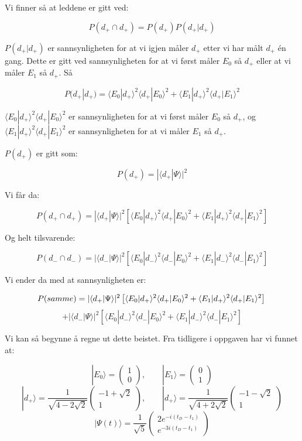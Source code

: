 \documentclass[a4paper,norsk, 10pt]{article}
\numberwithin{equation}{section}
\begin{document}
Vi finner så at leddene er gitt ved:

$$
P(d_+ \cap d_+) = P(d_+)P(d_+|d_+)
$$

$P(d_+|d_+)$ er sannsynligheten for at vi igjen måler $d_+$ etter vi har målt $d_+$ én gang. Dette er gitt ved sannsynligheten for at vi først måler $E_0$ så $d_+$ eller at vi måler $E_1$ så $d_+$. Så

$$
P(d_+|d_+) = \langle E_0|d_+\rangle^2\langle d_+|E_0\rangle^2 + \langle E_1|d_+\rangle^2\langle d_+|E_1\rangle^2
$$

$\langle E_0|d_+\rangle^2\langle d_+|E_0\rangle^2$ er sannsynligheten for at vi først måler $E_0$ så $d_+$, og $\langle E_1|d_+\rangle^2\langle d_+|E_1\rangle^2$ er sannsynligheten for at vi måler $E_1$ så $d_+$. 

$P(d_+)$ er gitt som:

$$
P(d_+) = |\langle d_+|\Psi\rangle|^2
$$

Vi får da:

$$
P(d_+ \cap d_+) = |\langle d_+|\Psi\rangle|^2\left[\langle E_0|d_+\rangle^2\langle d_+|E_0\rangle^2 + \langle E_1|d_+\rangle^2\langle d_+|E_1\rangle^2\right]
$$


Og helt tilsvarende:

$$
P(d_- \cap d_-) = |\langle d_-|\Psi\rangle|^2\left[\langle E_0|d_-\rangle^2\langle d_-|E_0\rangle^2 + \langle E_1|d_-\rangle^2\langle d_-|E_1\rangle^2\right]
$$

Vi ender da med at sannsynligheten er:

$$
P(samme) = |\langle d_+|\Psi\rangle|^2\left[\langle E_0|d_+\rangle^2\langle d_+|E_0\rangle^2 + \langle E_1|d_+\rangle^2\langle d_+|E_1\rangle^2\right] \\
$$
$$
+
 |\langle d_-|\Psi\rangle|^2\left[\langle E_0|d_-\rangle^2\langle d_-|E_0\rangle^2 + \langle E_1|d_-\rangle^2\langle d_-|E_1\rangle^2\right]
$$

Vi kan så begynne å regne ut dette beistet. Fra tidligere i oppgaven har vi funnet at:

$$
|E_0\rangle = 
\begin{pmatrix}
1\\0
\end{pmatrix}
, \qquad
|E_1\rangle = 
\begin{pmatrix}
0\\1
\end{pmatrix}
$$
$$
|d_+\rangle = 
\frac{1}{\sqrt{4-2\sqrt{2}}}
\begin{pmatrix}
-1+\sqrt{2}\\1
\end{pmatrix}
,\qquad
|d_+\rangle = 
\frac{1}{\sqrt{4+2\sqrt{2}}}
\begin{pmatrix}
-1-\sqrt{2}\\1
\end{pmatrix}
$$
$$
|\Psi(t)\rangle = \frac{1}{\sqrt{5}}
\begin{pmatrix}
2e^{-i(t_D-t_1)} \\ e^{-3i(t_D-t_1)}
\end{pmatrix}
$$
\end{document}
